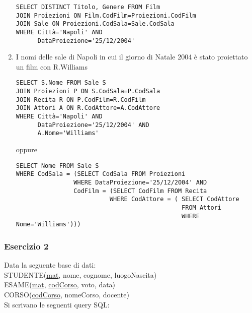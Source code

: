 \documentclass[a4paper]{article}
\begin{document}
\begin{enumerate}
\begin{verbatim}
SELECT DISTINCT Titolo, Genere FROM Film
JOIN Proiezioni ON Film.CodFilm=Proiezioni.CodFilm
JOIN Sale ON Proiezioni.CodSala=Sale.CodSala
WHERE Città='Napoli' AND
      DataProiezione='25/12/2004'
\end{verbatim}
\item  I nomi delle sale di Napoli in cui  il giorno di Natale 2004 è stato proiettato un film con R.Williams
\begin{verbatim}
SELECT S.Nome FROM Sale S
JOIN Proiezioni P ON S.CodSala=P.CodSala
JOIN Recita R ON P.CodFilm=R.CodFilm
JOIN Attori A ON R.CodAttore=A.CodAttore
WHERE Città='Napoli' AND
      DataProiezione='25/12/2004' AND
      A.Nome='Williams'
\end{verbatim}
oppure
\begin{verbatim}
SELECT Nome FROM Sale S
WHERE CodSala = (SELECT CodSala FROM Proiezioni
                WHERE DataProiezione='25/12/2004' AND
                CodFilm = (SELECT CodFilm FROM Recita
                          WHERE CodAttore = ( SELECT CodAttore
                                              FROM Attori
                                              WHERE Nome='Williams')))
\end{verbatim}
\end{enumerate}\par \subsubsection{Esercizio 2}
Data la seguente base di dati:\medskip\\
STUDENTE(\underline{mat}, nome, cognome, luogoNascita)\\
ESAME(\underline{mat}, \underline{codCorso}, voto, data)\\
CORSO(\underline{codCorso}, nomeCorso, docente)\medskip\\
Si scrivano le seguenti query SQL:
\end{document}
